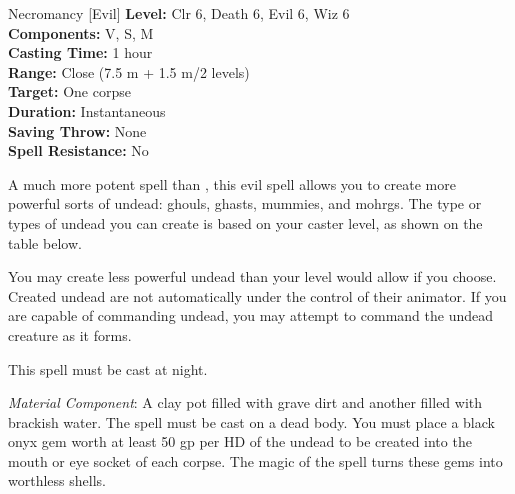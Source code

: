 {Necromancy [Evil]}
{
	\textbf{Level:}
	Clr 6, Death 6, Evil 6, Wiz 6\\
	\textbf{Components:}
	V, S, M\\
	\textbf{Casting Time:}
	1 hour\\
	\textbf{Range:}
	Close (7.5 m + 1.5 m/2 levels)\\
	\textbf{Target:}
	One corpse\\
	\textbf{Duration:}
	Instantaneous\\
	\textbf{Saving Throw:}
	None\\
	\textbf{Spell Resistance:}
	No\\
}
{
	A much more potent spell than , this evil spell allows you to create more powerful sorts of undead: ghouls, ghasts, mummies, and mohrgs. The type or types of undead you can create is based on your caster level, as shown on the table below.


	You may create less powerful undead than your level would allow if you choose. Created undead are not automatically under the control of their animator. If you are capable of commanding undead, you may attempt to command the undead creature as it forms.

	This spell must be cast at night.

	\textit{Material Component}:
	A clay pot filled with grave dirt and another filled with brackish water. The spell must be cast on a dead body. You must place a black onyx gem worth at least 50 gp per HD of the undead to be created into the mouth or eye socket of each corpse. The magic of the spell turns these gems into worthless shells.

}

